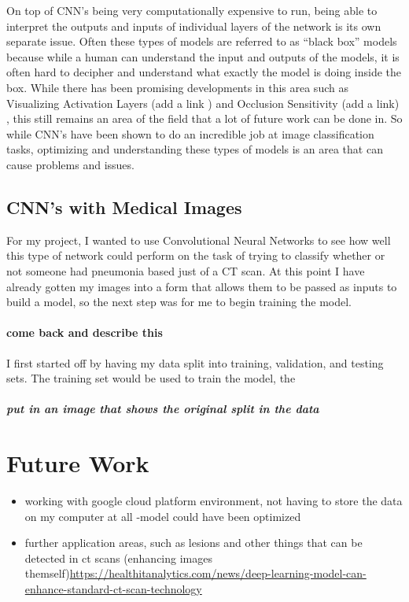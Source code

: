 \documentclass[12pt]{article}
\providecommand{\tightlist}{%
  \setlength{\itemsep}{0pt}\setlength{\parskip}{0pt}}
\begin{document}
On top of CNN's being very computationally expensive to run, being able
to interpret the outputs and inputs of individual layers of the network
is its own separate issue. Often these types of models are referred to
as ``black box'' models because while a human can understand the input
and outputs of the models, it is often hard to decipher and understand
what exactly the model is doing inside the box. While there has been
promising developments in this area such as Visualizing Activation
Layers (add a link ) and Occlusion Sensitivity (add a link) , this still
remains an area of the field that a lot of future work can be done in.
So while CNN's have been shown to do an incredible job at image
classification tasks, optimizing and understanding these types of models
is an area that can cause problems and issues.

\hypertarget{cnns-with-medical-images}{%
\subsection{CNN's with Medical Images}\label{cnns-with-medical-images}}

For my project, I wanted to use Convolutional Neural Networks to see how
well this type of network could perform on the task of trying to
classify whether or not someone had pneumonia based just of a CT scan.
At this point I have already gotten my images into a form that allows
them to be passed as inputs to build a model, so the next step was for
me to begin training the model.

\hypertarget{come-back-and-describe-this}{%
\paragraph{come back and describe
this}\label{come-back-and-describe-this}}

I first started off by having my data split into training, validation,
and testing sets. The training set would be used to train the model, the

\hypertarget{put-in-an-image-that-shows-the-original-split-in-the-data}{%
\subparagraph{put in an image that shows the original split in the
data}\label{put-in-an-image-that-shows-the-original-split-in-the-data}}

\hypertarget{future-work}{%
\section{Future Work}\label{future-work}}

\begin{itemize}
\tightlist
\item
  working with google cloud platform environment, not having to store
  the data on my computer at all -model could have been optimized
\item
  further application areas, such as lesions and other things that can
  be detected in ct scans (enhancing images
  themself)\url{https://healthitanalytics.com/news/deep-learning-model-can-enhance-standard-ct-scan-technology}
\end{itemize}



\end{document}
